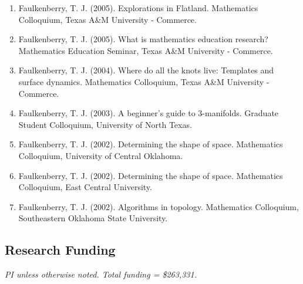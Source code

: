 \documentclass[article,10pt]{article}
\begin{document}
\begin{enumerate}
\item Faulkenberry, T. J. (2005). Explorations in Flatland. Mathematics Colloquium, Texas A\&M University - Commerce.
\item Faulkenberry, T. J. (2005). What is mathematics education research? Mathematics Education Seminar, Texas A\&M University - Commerce.
\item Faulkenberry, T. J. (2004). Where do all the knots live: Templates and surface dynamics. Mathematics Colloquium, Texas A\&M University - Commerce.
\item Faulkenberry, T. J. (2003). A beginner’s guide to 3-manifolds. Graduate Student Colloquium, University of North Texas.
\item Faulkenberry, T. J. (2002). Determining the shape of space. Mathematics Colloquium, University of Central Oklahoma.
\item Faulkenberry, T. J. (2002). Determining the shape of space. Mathematics Colloquium, East Central University.
\item Faulkenberry, T. J. (2002). Algorithms in topology. Mathematics Colloquium, Southeastern Oklahoma State University.
\end{enumerate}

\subsection*{Research Funding}
\label{sec:orgb281d34}

\emph{PI unless otherwise noted.  Total funding = \$263,331.}
\end{document}
